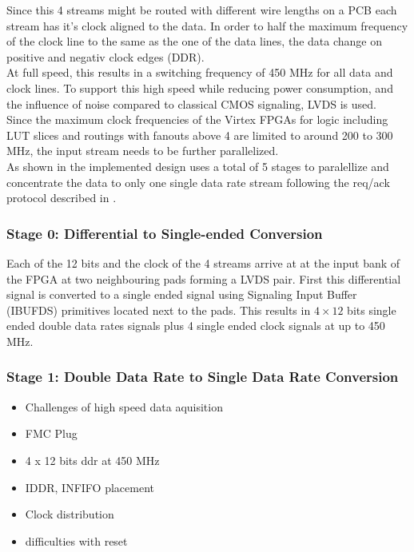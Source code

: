 Since this 4 streams might be routed with different wire lengths on a \gls{PCB}
each stream has it's clock aligned to the data.
In order to half the maximum frequency of the clock line to the same as the one
of the data lines, the data change on positive and negativ clock edges
(\gls{DDR}). \\

At full speed, this results in a switching frequency of 450 MHz for all data
and clock lines. To support this high speed while reducing power consumption,
and the influence of noise compared to classical \gls{CMOS} signaling, 
\gls{LVDS} is used. \\

Since the maximum clock frequencies of the Virtex \glspl{FPGA} for logic
including \gls{LUT} slices and routings with fanouts above 4
are limited to around 200 to 300 MHz, the input stream needs to be further
parallelized. \\

As shown in  the implemented design uses
a total of 5 stages to paralellize and concentrate the data to only
one single data rate stream following the req/ack protocol described in
.

\subsubsection{Stage 0: Differential to Single-ended Conversion}
Each of the 12 bits and the clock of the 4 streams arrive at at the input bank
of the \gls{FPGA} at two neighbouring pads forming a \gls{LVDS} pair.
First this differential signal is converted to a single ended signal using
{\emDifferential Signaling Input Buffer} (IBUFDS) primitives located next
to the pads. This results in $4 \times 12$ bits single ended double data rates
signals plus 4 single ended clock signals at up to 450 MHz.

\subsubsection{Stage 1: Double Data Rate to Single Data Rate Conversion}



\begin{itemize}
\item Challenges of high speed data aquisition
\item FMC Plug
\item 4 x 12 bits ddr at 450 MHz
\item IDDR, INFIFO placement
\item Clock distribution
\item difficulties with reset 
\end{itemize}

